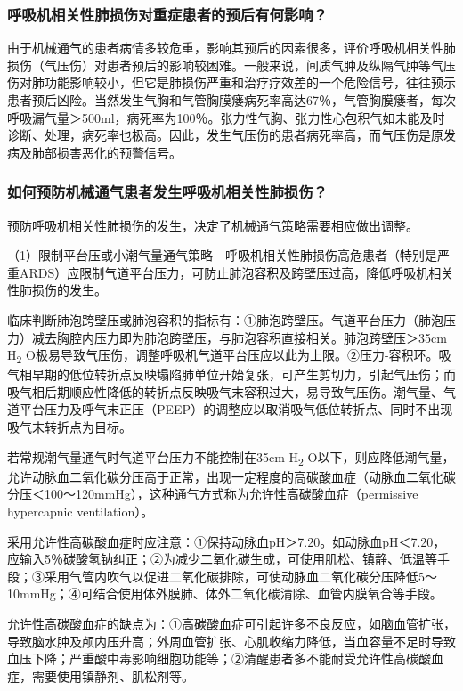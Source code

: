 \subsubsection{呼吸机相关性肺损伤对重症患者的预后有何影响？}

由于机械通气的患者病情多较危重，影响其预后的因素很多，评价呼吸机相关性肺损伤（气压伤）对患者预后的影响较困难。一般来说，间质气肿及纵隔气肿等气压伤对肺功能影响较小，但它是肺损伤严重和治疗疗效差的一个危险信号，往往预示患者预后凶险。当然发生气胸和气管胸膜瘘病死率高达67％，气管胸膜瘘者，每次呼吸漏气量＞500ml，病死率为100％。张力性气胸、张力性心包积气如未能及时诊断、处理，病死率也极高。因此，发生气压伤的患者病死率高，而气压伤是原发病及肺部损害恶化的预警信号。

\subsubsection{如何预防机械通气患者发生呼吸机相关性肺损伤？}

预防呼吸机相关性肺损伤的发生，决定了机械通气策略需要相应做出调整。

（1）限制平台压或小潮气量通气策略　呼吸机相关性肺损伤高危患者（特别是严重ARDS）应限制气道平台压力，可防止肺泡容积及跨壁压过高，降低呼吸机相关性肺损伤的发生。

临床判断肺泡跨壁压或肺泡容积的指标有：①肺泡跨壁压。气道平台压力（肺泡压力）减去胸腔内压力即为肺泡跨壁压，与肺泡容积直接相关。肺泡跨壁压＞35cm
H\textsubscript{2}
O极易导致气压伤，调整呼吸机气道平台压应以此为上限。②压力-容积环。吸气相早期的低位转折点反映塌陷肺单位开始复张，可产生剪切力，引起气压伤；而吸气相后期顺应性降低的转折点反映吸气末容积过大，易导致气压伤。潮气量、气道平台压力及呼气末正压（PEEP）的调整应以取消吸气低位转折点、同时不出现吸气末转折点为目标。

若常规潮气量通气时气道平台压力不能控制在35cm H\textsubscript{2}
O以下，则应降低潮气量，允许动脉血二氧化碳分压高于正常，出现一定程度的高碳酸血症（动脉血二氧化碳分压＜100～120mmHg），这种通气方式称为允许性高碳酸血症（permissive
hypercapnic ventilation）。

采用允许性高碳酸血症时应注意：①保持动脉血pH＞7.20。如动脉血pH＜7.20，应输入5％碳酸氢钠纠正；②为减少二氧化碳生成，可使用肌松、镇静、低温等手段；③采用气管内吹气以促进二氧化碳排除，可使动脉血二氧化碳分压降低5～10mmHg；④可结合使用体外膜肺、体外二氧化碳清除、血管内膜氧合等手段。

允许性高碳酸血症的缺点为：①高碳酸血症可引起许多不良反应，如脑血管扩张，导致脑水肿及颅内压升高；外周血管扩张、心肌收缩力降低，当血容量不足时导致血压下降；严重酸中毒影响细胞功能等；②清醒患者多不能耐受允许性高碳酸血症，需要使用镇静剂、肌松剂等。

